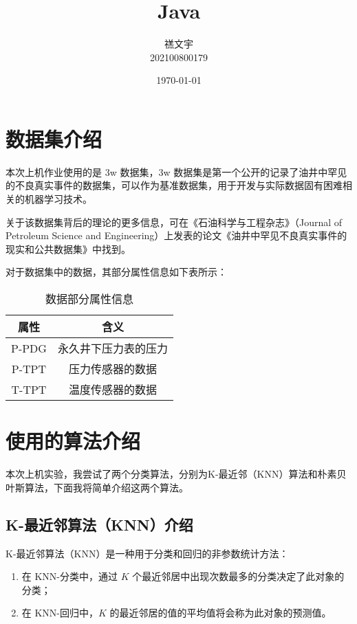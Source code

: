 \documentclass[a4paper, 11pt, cn]{elegantpaper}
\title{Java}
\author{禚文宇 \\ 202100800179}
\date{\today}
\begin{document}
\maketitle

\begin{abstract}
    
\end{abstract}

\section{数据集介绍}
本次上机作业使用的是 3w 数据集，3w 数据集是第一个公开的记录了油井中罕见的不良真实事件的数据集，可以作为基准数据集，用于开发与实际数据固有困难相关的机器学习技术。

关于该数据集背后的理论的更多信息，可在《石油科学与工程杂志》（Journal of Petroleum Science and Engineering）上发表的论文《油井中罕见不良真实事件的现实和公共数据集》\cite{3w}中找到。

对于数据集中的数据，其部分属性信息如下表所示：

\begin{table}[htbp]\centering
    \begin{tabular}{|c|c|}
    \hline
    属性    & 含义         \\ \hline
    P-PDG & 永久井下压力表的压力 \\ \hline
    P-TPT & 压力传感器的数据   \\ \hline
    T-TPT & 温度传感器的数据   \\ \hline
    \end{tabular}
    \caption{数据部分属性信息}
\end{table}

\section{使用的算法介绍}

本次上机实验，我尝试了两个分类算法，分别为K-最近邻（KNN）算法和朴素贝叶斯算法，下面我将简单介绍这两个算法。

\subsection{K-最近邻算法（KNN）介绍}

K-最近邻算法（KNN）是一种用于分类和回归的非参数统计方法：
\begin{enumerate}
    \item 在 KNN-分类中，通过 $K$ 个最近邻居中出现次数最多的分类决定了此对象的分类；
    \item 在 KNN-回归中，$K$ 的最近邻居的值的平均值将会称为此对象的预测值。
\end{enumerate}
\end{document}
